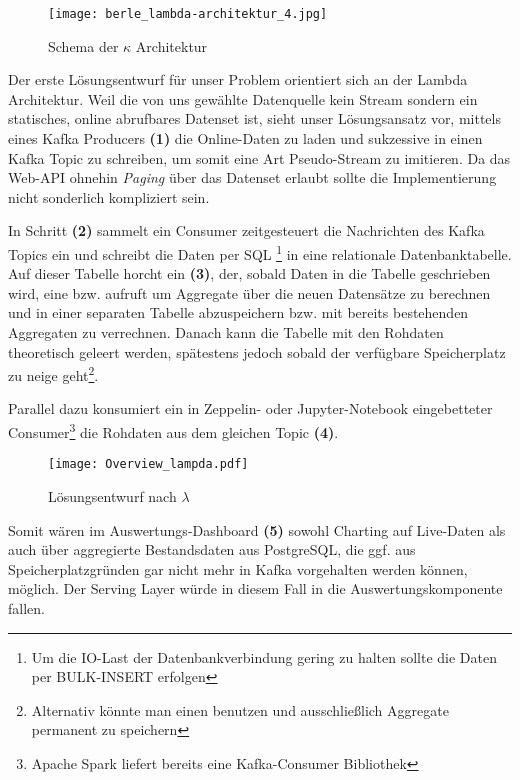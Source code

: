 \begin{description}
\begin{figure}[h]
	\centering
	\texttt{[image: berle\_lambda-architektur\_4.jpg]}
	\caption[Schema der $\kappa$ Architektur]{Schema der $\kappa$ Architektur\autocite{jaxkappa}}
	\label{fig:KappaArchitecture}
\end{figure}

\end{description}

Der erste Lösungsentwurf für unser Problem orientiert sich an der Lambda Architektur. Weil die von uns gewählte Datenquelle kein Stream sondern ein statisches, online abrufbares Datenset ist, sieht unser Lösungsansatz vor, mittels eines Kafka Producers \textbf{(1)} die Online-Daten zu laden und sukzessive in einen Kafka Topic zu schreiben, um somit eine Art Pseudo-Stream zu imitieren. Da das Web-API ohnehin \textit{Paging} über das Datenset erlaubt sollte die Implementierung nicht sonderlich kompliziert sein.

In Schritt \textbf{(2)} sammelt ein Consumer zeitgesteuert die Nachrichten des Kafka Topics ein und schreibt die Daten per SQL  \footnote{Um die IO-Last der Datenbankverbindung gering zu halten sollte die Daten per BULK-INSERT erfolgen} in eine relationale Datenbanktabelle. Auf dieser Tabelle horcht ein  \textbf{(3)}, der, sobald Daten in die Tabelle geschrieben wird, eine  bzw.  aufruft um Aggregate über die neuen Datensätze zu berechnen und in einer separaten Tabelle abzuspeichern bzw. mit bereits bestehenden Aggregaten zu verrechnen. Danach kann die Tabelle mit den Rohdaten theoretisch geleert werden, spätestens jedoch sobald der verfügbare Speicherplatz zu neige geht\footnote{Alternativ könnte man einen  benutzen und ausschließlich Aggregate permanent zu speichern}.

Parallel dazu konsumiert ein in Zeppelin- oder Jupyter-Notebook eingebetteter Consumer\footnote{Apache Spark liefert bereits eine Kafka-Consumer Bibliothek} die Rohdaten aus dem gleichen Topic \textbf{(4)}.

\begin{figure}[h] %
	\centering
	\texttt{[image: Overview\_lampda.pdf]}
	\caption[Lösungsentwurf nach $\lambda$]{Lösungsentwurf nach $\lambda$}
	\label{fig:OurLampdaArchitecture}
\end{figure}

Somit wären im Auswertungs-Dashboard \textbf{(5)} sowohl Charting auf Live-Daten als auch über aggregierte Bestandsdaten aus PostgreSQL, die ggf. aus Speicherplatzgründen gar nicht mehr in Kafka vorgehalten werden können, möglich. Der Serving Layer würde in diesem Fall in die Auswertungskomponente fallen.


